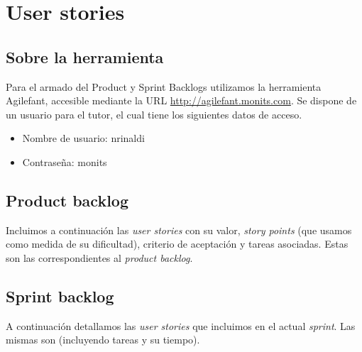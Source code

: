 \documentclass[10pt, a4paper,english,spanish]{article}
\begin{document}

\maketitle
\pagebreak

\tableofcontents
\pagebreak

\section{User stories}

\subsection{Sobre la herramienta}

Para el armado del Product y Sprint Backlogs utilizamos la herramienta Agilefant,
accesible mediante la URL \url{http://agilefant.monits.com}. Se
dispone de un usuario para el tutor, el cual tiene los siguientes datos de acceso.

\begin{itemize}
	\item Nombre de usuario: nrinaldi
	\item Contrase\~na: monits
\end{itemize}

\subsection{Product backlog}

Incluimos a continuaci\'on las \textit{user stories} con su valor, \textit{story points} (que usamos
como medida de su dificultad), criterio de aceptaci\'on y tareas asociadas. Estas son las 
correspondientes al \textit{product backlog}.



\subsection{Sprint backlog}

A continuaci\'on detallamos las \textit{user stories} que incluimos en el actual \textit{sprint}. Las mismas son (incluyendo tareas y su tiempo).
\end{document}
